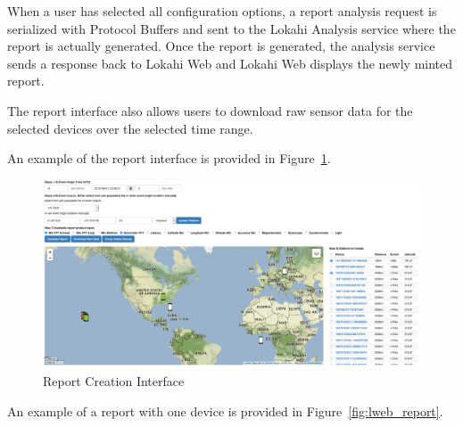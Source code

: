 When a user has selected all configuration options, a report analysis request is serialized with Protocol Buffers and sent to the Lokahi Analysis service where the report is actually generated. Once the report is generated, the analysis service sends a response back to Lokahi Web and Lokahi Web displays the newly minted report.

The report interface also allows users to download raw sensor data for the selected devices over the selected time range.

An example of the report interface is provided in Figure~\ref{fig:lweb_reportcreate}.

\begin{figure}
	\centering
	\includegraphics[width=0.7\linewidth]{figures/lweb_reportcreate.png}
	\caption{Report Creation Interface}
	\label{fig:lweb_reportcreate}
\end{figure}

An example of a report with one device is provided in Figure~\ref{fig:lweb_report}.

